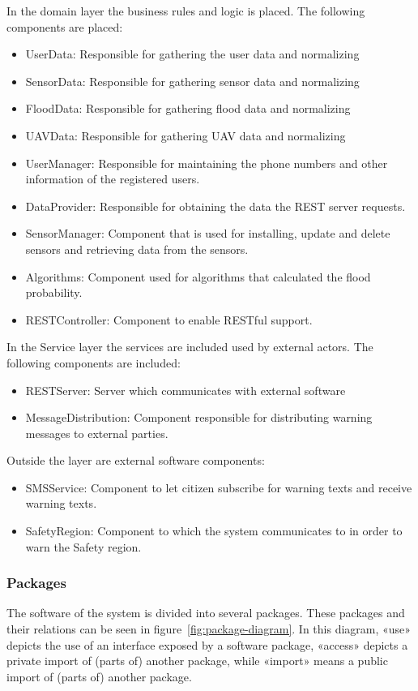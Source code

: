 In the domain layer the business rules and logic is placed. The following components are placed:
\begin{itemize}
	\item UserData: Responsible for gathering the user data and normalizing
	\item SensorData: Responsible for gathering sensor data and normalizing
	\item FloodData: Responsible for gathering flood data and normalizing
	\item UAVData: Responsible for gathering UAV data and normalizing
	\item UserManager: Responsible for maintaining the phone numbers and other information of the registered users.
	\item DataProvider: Responsible for obtaining the data the REST server requests. 
	\item SensorManager: Component that is used for installing, update and delete sensors and retrieving data from the sensors.
	\item Algorithms: Component used for algorithms that calculated the flood probability.
	\item RESTController: Component to enable RESTful support.
\end{itemize}

In the Service layer the services are included used by external actors. The following components are included:
\begin{itemize}
	\item RESTServer: Server which communicates with external software
	\item MessageDistribution: Component responsible for distributing warning messages to external parties.
	\end{itemize}
	
Outside the layer are external software components:
\begin{itemize}
	\item SMSService: Component to let citizen subscribe for warning texts and receive warning texts.
	\item SafetyRegion: Component to which the system communicates to in order to warn the Safety region.
	\end{itemize}


\subsubsection{Packages}
The software of the system is divided into several packages. These packages and their relations can be seen in figure~\ref{fig:package-diagram}. 
In this diagram, «use» depicts the use of an interface exposed by a software package, «access» depicts a private import of (parts of) another package, while «import» means a public import of (parts of) another package. 

